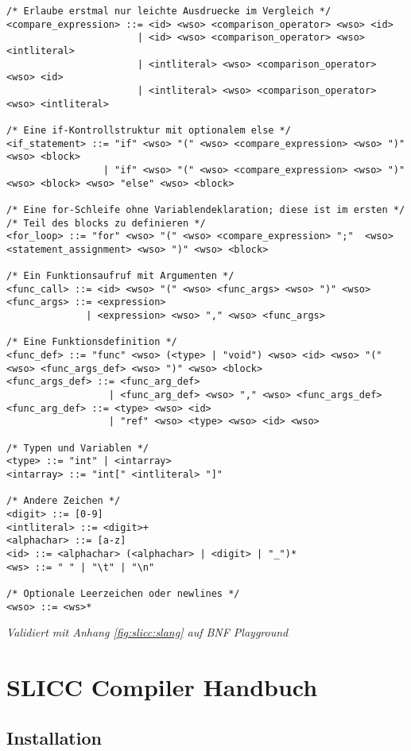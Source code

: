 \begin{lstlisting}
/* Erlaube erstmal nur leichte Ausdruecke im Vergleich */
<compare_expression> ::= <id> <wso> <comparison_operator> <wso> <id>
                       | <id> <wso> <comparison_operator> <wso> <intliteral>
                       | <intliteral> <wso> <comparison_operator> <wso> <id>
                       | <intliteral> <wso> <comparison_operator> <wso> <intliteral>

/* Eine if-Kontrollstruktur mit optionalem else */
<if_statement> ::= "if" <wso> "(" <wso> <compare_expression> <wso> ")" <wso> <block>
                 | "if" <wso> "(" <wso> <compare_expression> <wso> ")"  <wso> <block> <wso> "else" <wso> <block>

/* Eine for-Schleife ohne Variablendeklaration; diese ist im ersten */
/* Teil des blocks zu definieren */
<for_loop> ::= "for" <wso> "(" <wso> <compare_expression> ";"  <wso> <statement_assignment> <wso> ")" <wso> <block>

/* Ein Funktionsaufruf mit Argumenten */
<func_call> ::= <id> <wso> "(" <wso> <func_args> <wso> ")" <wso>
<func_args> ::= <expression>
              | <expression> <wso> "," <wso> <func_args>

/* Eine Funktionsdefinition */
<func_def> ::= "func" <wso> (<type> | "void") <wso> <id> <wso> "(" <wso> <func_args_def> <wso> ")" <wso> <block>
<func_args_def> ::= <func_arg_def>
                  | <func_arg_def> <wso> "," <wso> <func_args_def>
<func_arg_def> ::= <type> <wso> <id>
                  | "ref" <wso> <type> <wso> <id> <wso>

/* Typen und Variablen */
<type> ::= "int" | <intarray>
<intarray> ::= "int[" <intliteral> "]"

/* Andere Zeichen */
<digit> ::= [0-9]
<intliteral> ::= <digit>+
<alphachar> ::= [a-z]
<id> ::= <alphachar> (<alphachar> | <digit> | "_")*
<ws> ::= " " | "\t" | "\n"

/* Optionale Leerzeichen oder newlines */
<wso> ::= <ws>*

\end{lstlisting}
\hfil\textit{Validiert mit Anhang \ref{fig:slicc:slang} auf BNF Playground\cite{paulklineBNFPlayground}}\\

\chapter{SLICC Compiler Handbuch}

\section{Installation}

